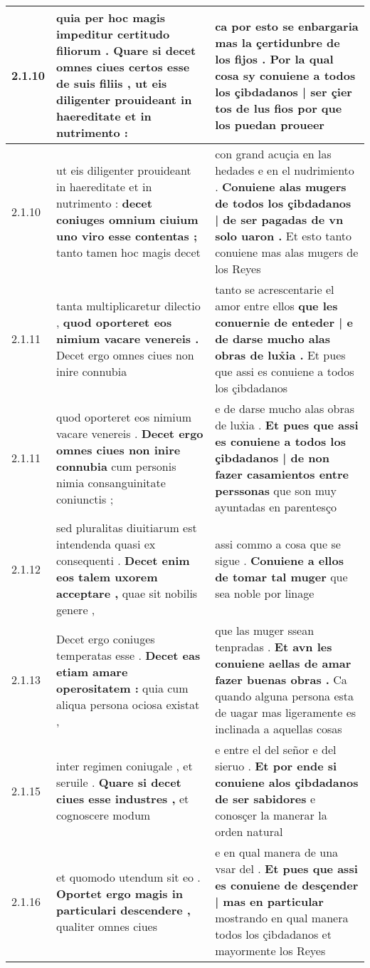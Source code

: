 \begin{tabular}{|p{1cm}|p{6.5cm}|p{6.5cm}|}
2.1.10 & quia per hoc magis impeditur certitudo filiorum . \textbf{ Quare si decet omnes ciues certos esse de suis filiis , } ut eis diligenter prouideant in haereditate et in nutrimento : & ca por esto se enbargaria mas la çertidunbre de los fijos . \textbf{ Por la qual cosa sy conuiene a todos los çibdadanos | ser çier tos de lus fios } por que los puedan proueer \\\hline
2.1.10 & ut eis diligenter prouideant in haereditate et in nutrimento : \textbf{ decet coniuges omnium ciuium uno viro esse contentas ; } tanto tamen hoc magis decet & con grand acuçia en las hedades e en el nudrimiento . \textbf{ Conuiene alas mugers de todos los çibdadanos | de ser pagadas de vn solo uaron . } Et esto tanto conuiene mas alas mugers de los Reyes \\\hline
2.1.11 & tanta multiplicaretur dilectio , \textbf{ quod oporteret eos nimium vacare venereis . } Decet ergo omnes ciues non inire connubia & tanto se acrescentarie el amor entre ellos \textbf{ que les conuernie de enteder | e de darse mucho alas obras de lux̉ia . } Et pues que assi es conuiene a todos los çibdadanos \\\hline
2.1.11 & quod oporteret eos nimium vacare venereis . \textbf{ Decet ergo omnes ciues non inire connubia } cum personis nimia consanguinitate coniunctis ; & e de darse mucho alas obras de lux̉ia . \textbf{ Et pues que assi es conuiene a todos los çibdadanos | de non fazer casamientos entre perssonas } que son muy ayuntadas en parentesço \\\hline
2.1.12 & sed pluralitas diuitiarum est intendenda quasi ex consequenti . \textbf{ Decet enim eos talem uxorem acceptare , } quae sit nobilis genere , & assi commo a cosa que se sigue . \textbf{ Conuiene a ellos de tomar tal muger } que sea noble por linage \\\hline
2.1.13 & Decet ergo coniuges temperatas esse . \textbf{ Decet eas etiam amare operositatem : } quia cum aliqua persona ociosa existat , & que las muger ssean tenpradas . \textbf{ Et avn les conuiene aellas de amar fazer buenas obras . } Ca quando alguna persona esta de uagar mas ligeramente es inclinada a aquellas cosas \\\hline
2.1.15 & inter regimen coniugale , et seruile . \textbf{ Quare si decet ciues esse industres , } et cognoscere modum & e entre el del señor e del sieruo . \textbf{ Et por ende si conuiene alos çibdadanos de ser sabidores } e conosçer la manerar la orden natural \\\hline
2.1.16 & et quomodo utendum sit eo . \textbf{ Oportet ergo magis in particulari descendere , } qualiter omnes ciues & e en qual manera de una vsar del . \textbf{ Et pues que assi es conuiene de desçender | mas en particular } mostrando en qual manera todos los çibdadanos et mayormente los Reyes \\\hline

\end{tabular}
